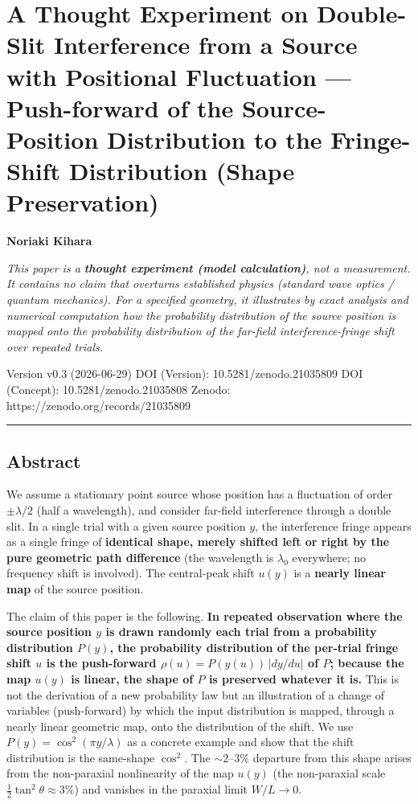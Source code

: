 \documentclass[
]{article}
\author{}
\date{}
\begin{document}
\section{A Thought Experiment on Double-Slit Interference from a Source
with Positional Fluctuation --- Push-forward of the Source-Position
Distribution to the Fringe-Shift Distribution (Shape
Preservation)}\label{a-thought-experiment-on-double-slit-interference-from-a-source-with-positional-fluctuation-push-forward-of-the-source-position-distribution-to-the-fringe-shift-distribution-shape-preservation}

\textbf{Noriaki Kihara}

\emph{This paper is a \textbf{thought experiment (model calculation)},
not a measurement. It contains no claim that overturns established
physics (standard wave optics / quantum mechanics). For a specified
geometry, it illustrates by exact analysis and numerical computation how
the probability distribution of the source position is mapped onto the
probability distribution of the far-field interference-fringe shift over
repeated trials.}

Version v0.3 (2026-06-29) DOI (Version): 10.5281/zenodo.21035809 DOI
(Concept): 10.5281/zenodo.21035808 Zenodo:
https://zenodo.org/records/21035809

\begin{center}\rule{0.5\linewidth}{0.5pt}\end{center}

\subsection{Abstract}\label{abstract}

We assume a stationary point source whose position has a fluctuation of
order \(\pm\lambda/2\) (half a wavelength), and consider far-field
interference through a double slit. In a single trial with a given
source position \(y\), the interference fringe appears as a single
fringe of \textbf{identical shape, merely shifted left or right by the
pure geometric path difference} (the wavelength is \(\lambda_0\)
everywhere; no frequency shift is involved). The central-peak shift
\(u(y)\) is a \textbf{nearly linear map} of the source position.

The claim of this paper is the following. \textbf{In repeated
observation where the source position \(y\) is drawn randomly each trial
from a probability distribution \(P(y)\), the probability distribution
of the per-trial fringe shift \(u\) is the push-forward
\(\rho(u)=P(y(u))\,|dy/du|\) of \(P\); because the map \(u(y)\) is
linear, the shape of \(P\) is preserved whatever it is.} This is not the
derivation of a new probability law but an illustration of a change of
variables (push-forward) by which the input distribution is mapped,
through a nearly linear geometric map, onto the distribution of the
shift. We use \(P(y)=\cos^2(\pi y/\lambda)\) as a concrete example and
show that the shift distribution is the same-shape \(\cos^2\). The
\(\sim2\text{–}3\%\) departure from this shape arises from the
non-paraxial nonlinearity of the map \(u(y)\) (the non-paraxial scale
\(\tfrac12\tan^2\theta\approx3\%\)) and vanishes in the paraxial limit
\(W/L\to0\).
\end{document}
